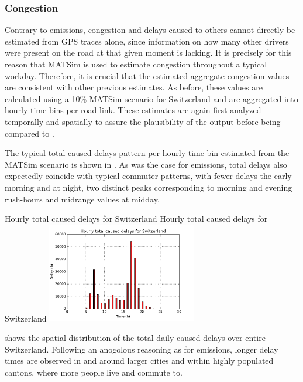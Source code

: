 \subsubsection{Congestion}

Contrary to emissions, congestion and delays caused to others cannot directly be estimated from GPS traces alone, since information on how many other drivers were present on the road at that given moment is lacking.
It is precisely for this reason that MATSim is used to estimate congestion throughout a typical workday.
Therefore, it is crucial that the estimated aggregate congestion values are consistent with other previous estimates.
As before, these values are calculated using a 10\% MATSim scenario for Switzerland and are aggregated into hourly time bins per road link.
These estimates are again first analyzed temporally and spatially to assure the plausibility of the output before being compared to \cite{mkinfras2016staukosten}.

The typical total caused delays pattern per hourly time bin estimated from the MATSim scenario is shown in .
As was the case for emissions, total delays also expectedly coincide with typical commuter patterns, with fewer delays the early morning and at night, two distinct peaks corresponding to morning and evening rush-hours and midrange values at midday.

\createfigure%
{Hourly total caused delays for Switzerland}%
{Hourly total caused delays for Switzerland}%
{\label{fig:hourlyDelays}}%
{\includegraphics[width=0.49\textwidth,
angle=0]{figures/hourly_caused_delays.pdf}}%
{}

 shows the spatial distribution of the total daily caused delays over entire Switzerland.
Following an anogolous reasoning as for emissions, longer delay times are observed in and around larger cities and within highly populated cantons, where more people live and commute to.

